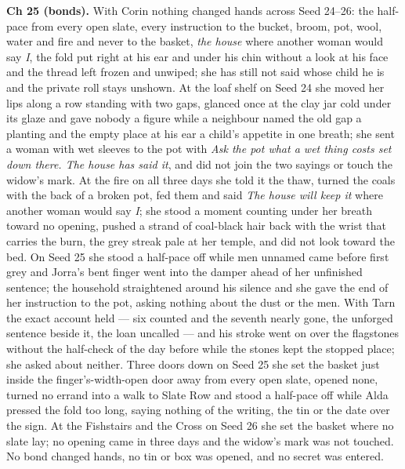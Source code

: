 \documentclass{design/chronicle}
\begin{document}
{\textbf{Ch 25 (bonds).} With Corin nothing changed hands across Seed 24–26: the half-pace from every open slate, every instruction to the bucket, broom, pot, wool, water and fire and never to the basket, \emph{the house} where another woman would say \emph{I}, the fold put right at his ear and under his chin without a look at his face and the thread left frozen and unwiped; she has still not said whose child he is and the private roll stays unshown. At the loaf shelf on Seed 24 she moved her lips along a row standing with two gaps, glanced once at the clay jar cold under its glaze and gave nobody a figure while a neighbour named the old gap a planting and the empty place at his ear a child’s appetite in one breath; she sent a woman with wet sleeves to the pot with \emph{Ask the pot what a wet thing costs set down there. The house has said it}, and did not join the two sayings or touch the widow’s mark. At the fire on all three days she told it the thaw, turned the coals with the back of a broken pot, fed them and said \emph{The house will keep it} where another woman would say \emph{I}; she stood a moment counting under her breath toward no opening, pushed a strand of coal-black hair back with the wrist that carries the burn, the grey streak pale at her temple, and did not look toward the bed. On Seed 25 she stood a half-pace off while men unnamed came before first grey and Jorra’s bent finger went into the damper ahead of her unfinished sentence; the household straightened around his silence and she gave the end of her instruction to the pot, asking nothing about the dust or the men. With Tarn the exact account held — six counted and the seventh nearly gone, the unforged sentence beside it, the loan uncalled — and his stroke went on over the flagstones without the half-check of the day before while the stones kept the stopped place; she asked about neither. Three doors down on Seed 25 she set the basket just inside the finger’s-width-open door away from every open slate, opened none, turned no errand into a walk to Slate Row and stood a half-pace off while Alda pressed the fold too long, saying nothing of the writing, the tin or the date over the sign. At the Fishstairs and the Cross on Seed 26 she set the basket where no slate lay; no opening came in three days and the widow’s mark was not touched. No bond changed hands, no tin or box was opened, and no secret was entered.

}
\end{document}
